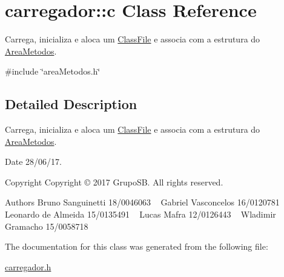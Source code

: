 \hypertarget{classcarregador_1_1c}{}\section{carregador\+:\+:c Class Reference}
\label{classcarregador_1_1c}


Carrega, inicializa e aloca um \hyperlink{structClassFile}{Class\+File} e associa com a estrutura do \hyperlink{structAreaMetodos}{Area\+Metodos}.  




{\ttfamily \#include \char`\"{}area\+Metodos.\+h\char`\"{}}



\subsection{Detailed Description}
Carrega, inicializa e aloca um \hyperlink{structClassFile}{Class\+File} e associa com a estrutura do \hyperlink{structAreaMetodos}{Area\+Metodos}. 

\begin{DoxyDate}{Date}
28/06/17. 
\end{DoxyDate}
\begin{DoxyCopyright}{Copyright}
Copyright © 2017 Grupo\+SB. All rights reserved.
\end{DoxyCopyright}
\begin{DoxyAuthor}{Authors}
Bruno Sanguinetti 18/0046063 ~\newline
Gabriel Vasconcelos 16/0120781 ~\newline
Leonardo de Almeida 15/0135491 ~\newline
Lucas Mafra 12/0126443 ~\newline
Wladimir Gramacho 15/0058718 ~\newline

\end{DoxyAuthor}


The documentation for this class was generated from the following file\+:\begin{DoxyCompactItemize}
\item 
\hyperlink{carregador_8h}{carregador.\+h}\end{DoxyCompactItemize}
